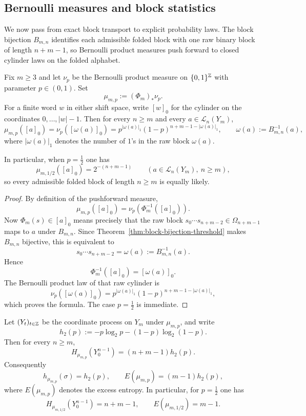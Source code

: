 \subsection{Bernoulli measures and block statistics}

We now pass from exact block transport to explicit probability laws.  The block
bijection $B_{m,n}$ identifies each admissible folded block with one raw
binary block of length $n+m-1$, so Bernoulli product measures push forward to
closed cylinder laws on the folded alphabet.

\begin{theorem}
\label{thm:bernoulli-transport-cylinder-law}
Fix $m\ge 3$ and let $\nu_p$ be the Bernoulli product measure on
$\{0,1\}^{\mathbb{Z}}$ with parameter $p\in(0,1)$.  Set
\[
\mu_{m,p}:=(\Phi_m)_*\nu_p.
\]
For a finite word $w$ in either shift space, write $[w]_0$ for the cylinder on
the coordinates $0,\ldots,\lvert w\rvert-1$.  Then for every $n\ge m$ and
every $a\in\mathcal L_n(Y_m)$,
\[
\mu_{m,p}([a]_0)
=
\nu_p([\omega(a)]_0)
=
p^{|\omega(a)|_1}(1-p)^{n+m-1-|\omega(a)|_1},
\qquad
\omega(a):=B_{m,n}^{-1}(a),
\]
where $|\omega(a)|_1$ denotes the number of $1$'s in the raw block
$\omega(a)$.

In particular, when $p=\tfrac12$ one has
\[
\mu_{m,1/2}([a]_0)=2^{-(n+m-1)}
\qquad (a\in\mathcal L_n(Y_m),\ n\ge m),
\]
so every admissible folded block of length $n\ge m$ is equally likely.
\end{theorem}

\begin{proof}
By definition of the pushforward measure,
\[
\mu_{m,p}([a]_0)=\nu_p(\Phi_m^{-1}([a]_0)).
\]
Now $\Phi_m(s)\in[a]_0$ means precisely that the raw block
$s_0\cdots s_{n+m-2}\in\Omega_{n+m-1}$ maps to $a$ under $B_{m,n}$.  Since
Theorem~\ref{thm:block-bijection-threshold} makes $B_{m,n}$ bijective, this is
equivalent to
\[
s_0\cdots s_{n+m-2}=\omega(a):=B_{m,n}^{-1}(a).
\]
Hence
\[
\Phi_m^{-1}([a]_0)=[\omega(a)]_0.
\]
The Bernoulli product law of that raw cylinder is
\[
\nu_p([\omega(a)]_0)
=
p^{|\omega(a)|_1}(1-p)^{n+m-1-|\omega(a)|_1},
\]
which proves the formula.  The case $p=\tfrac12$ is immediate.
\end{proof}

\begin{corollary}
\label{cor:exact-entropy-profile}
Let $(Y_t)_{t\in\mathbb{Z}}$ be the coordinate process on $Y_m$ under $\mu_{m,p}$, and
write
\[
h_2(p):=-p\log_2 p-(1-p)\log_2(1-p).
\]
Then for every $n\ge m$,
\[
H_{\mu_{m,p}}(Y_0^{n-1})=(n+m-1)h_2(p).
\]
Consequently
\[
h_{\mu_{m,p}}(\sigma)=h_2(p),
\qquad
E(\mu_{m,p})=(m-1)h_2(p),
\]
where $E(\mu_{m,p})$ denotes the excess entropy.  In particular, for
$p=\tfrac12$ one has
\[
H_{\mu_{m,1/2}}(Y_0^{n-1})=n+m-1,
\qquad
E(\mu_{m,1/2})=m-1.
\]
\end{corollary}

